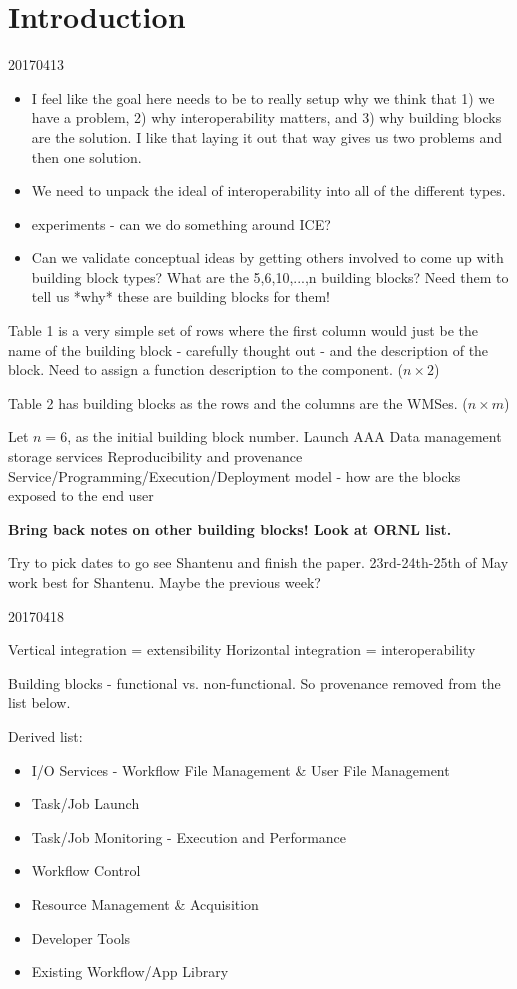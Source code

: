 \section{Introduction}

20170413
\begin{itemize}
\item I feel like the goal here needs to be to really setup why we think that 1) we have a problem, 2) why interoperability matters, and 3) why building blocks are the solution. I like that laying it out that way gives us two problems and then one solution.
\item We need to unpack the ideal of interoperability into all of the different types.
\item experiments - can we do something around ICE?
\item Can we validate conceptual ideas by getting others involved to come up with building block types? What are the 5,6,10,...,n building blocks? Need them to tell us *why* these are building blocks for them!
\end{itemize}

Table 1 is a very simple set of rows where the first column would just be the name of the building block - carefully thought out - and the description of the block. Need to assign a function description to the component. ($n \times 2$)

Table 2 has building blocks as the rows and the columns are the WMSes. ($n \times m$)

Let $n = 6$, as the initial building block number.
Launch
AAA
Data management storage services
Reproducibility and provenance
Service/Programming/Execution/Deployment model - how are the blocks exposed to the end user

\textbf{Bring back notes on other building blocks! Look at ORNL list.}

Try to pick dates to go see Shantenu and finish the paper. 23rd-24th-25th of May work best for Shantenu. Maybe the previous week?

20170418

Vertical integration = extensibility
Horizontal integration = interoperability

Building blocks - functional vs. non-functional. So provenance removed from the list below.

Derived list:
\begin{itemize}
\item I/O Services - Workflow File Management \& User File Management
\item Task/Job Launch
\item Task/Job Monitoring - Execution and Performance
\item Workflow Control
\item Resource Management \& Acquisition
\item Developer Tools
\item Existing Workflow/App Library
\end{itemize}

